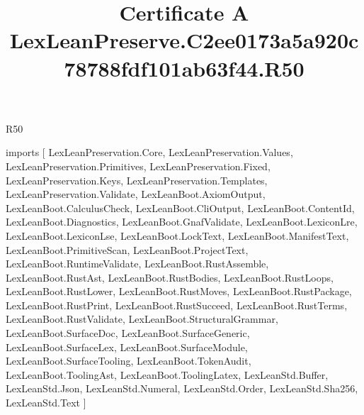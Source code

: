 \begin{lexlean}{R50}
\title{Certificate A LexLeanPreserve.C2ee0173a5a920c78788fdf101ab63f44.R50}
\begin{coremodule}
imports [
  LexLeanPreservation.Core,
  LexLeanPreservation.Values,
  LexLeanPreservation.Primitives,
  LexLeanPreservation.Fixed,
  LexLeanPreservation.Keys,
  LexLeanPreservation.Templates,
  LexLeanPreservation.Validate,
  LexLeanBoot.AxiomOutput,
  LexLeanBoot.CalculusCheck,
  LexLeanBoot.CliOutput,
  LexLeanBoot.ContentId,
  LexLeanBoot.Diagnostics,
  LexLeanBoot.GnafValidate,
  LexLeanBoot.LexiconLre,
  LexLeanBoot.LexiconLse,
  LexLeanBoot.LockText,
  LexLeanBoot.ManifestText,
  LexLeanBoot.PrimitiveScan,
  LexLeanBoot.ProjectText,
  LexLeanBoot.RuntimeValidate,
  LexLeanBoot.RustAssemble,
  LexLeanBoot.RustAst,
  LexLeanBoot.RustBodies,
  LexLeanBoot.RustLoops,
  LexLeanBoot.RustLower,
  LexLeanBoot.RustMoves,
  LexLeanBoot.RustPackage,
  LexLeanBoot.RustPrint,
  LexLeanBoot.RustSucceed,
  LexLeanBoot.RustTerms,
  LexLeanBoot.RustValidate,
  LexLeanBoot.StructuralGrammar,
  LexLeanBoot.SurfaceDoc,
  LexLeanBoot.SurfaceGeneric,
  LexLeanBoot.SurfaceLex,
  LexLeanBoot.SurfaceModule,
  LexLeanBoot.SurfaceTooling,
  LexLeanBoot.TokenAudit,
  LexLeanBoot.ToolingAst,
  LexLeanBoot.ToolingLatex,
  LexLeanStd.Buffer,
  LexLeanStd.Json,
  LexLeanStd.Numeral,
  LexLeanStd.Order,
  LexLeanStd.Sha256,
  LexLeanStd.Text
]


\end{coremodule}
\end{lexlean}
